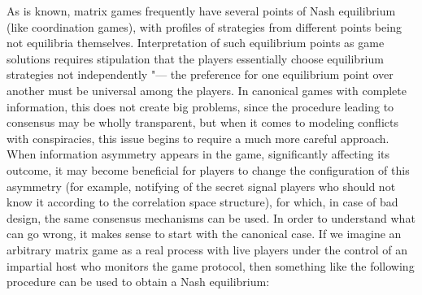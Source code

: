 As is known, matrix games frequently have several points of Nash equilibrium (like coordination games), with profiles of strategies from different points being not equilibria themselves. Interpretation of such equilibrium points as game solutions requires stipulation that the players essentially choose equilibrium strategies not independently "--- the preference for one equilibrium point over another must be universal among the players. In canonical games with complete information, this does not create big problems, since the procedure leading to consensus may be wholly transparent, but when it comes to modeling conflicts with conspiracies, this issue begins to require a much more careful approach. When information asymmetry appears in the game, significantly affecting its outcome, it may become beneficial for players to change the configuration of this asymmetry (for example, notifying of the secret signal players who should not know it according to the correlation space structure), for which, in case of bad design, the same consensus mechanisms can be used. In order to understand what can go wrong, it makes sense to start with the canonical case. If we imagine an arbitrary matrix game as a real process with live players under the control of an impartial host who monitors the game protocol, then something like the following procedure can be used to obtain a Nash equilibrium: %

